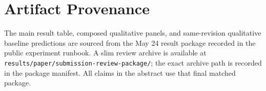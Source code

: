 \documentclass[10pt]{article}
\begin{document}



\appendix
\section{Artifact Provenance}

The main result table, composed qualitative panels, and same-revision
qualitative baseline predictions are sourced from the May 24 result package
recorded in the public experiment runbook. A slim review archive is available at
\texttt{results/paper/submission-review-package/}; the exact archive path is
recorded in the package manifest. All claims in the abstract use that final
matched package.
\end{document}
